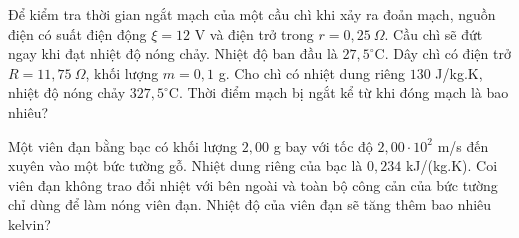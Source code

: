 \begin{ex}
Để kiểm tra thời gian ngắt mạch của một cầu chì khi xảy ra đoản mạch, nguồn điện có suất điện động $\xi=12$ V và điện trở trong $r=0,25\ \Omega$. Cầu chì sẽ đứt ngay khi đạt nhiệt độ nóng chảy. Nhiệt độ ban đầu là $27,5^\circ\mathrm{C}$. Dây chì có điện trở $R=11,75\ \Omega$, khối lượng $m=0,1$ g. Cho chì có nhiệt dung riêng $130$ J/kg.K, nhiệt độ nóng chảy $327,5^\circ\mathrm{C}$. Thời điểm mạch bị ngắt kể từ khi đóng mạch là bao nhiêu?
\loigiai{\[I=\frac{\xi}{R+r}=\frac{12}{11,75+0,25}=1\ \mathrm{A}.\]
\[P=I^2R=11,75\ \mathrm{W}.\]
\[m=0,1\ \mathrm{g}=10^{-4}\ \mathrm{kg},\qquad \Delta T=327,5-27,5=300\ \mathrm{K}.\]
\[Q=mc\Delta T=10^{-4}\cdot130\cdot300=3,9\ \mathrm{J}.\]
\[t=\frac{Q}{P}=\frac{3,9}{11,75}\approx0,33\ \mathrm{s}.\]}
\end{ex}

\begin{ex}
Một viên đạn bằng bạc có khối lượng $2,00$ g bay với tốc độ $2,00\cdot10^2$ m/s đến xuyên vào một bức tường gỗ. Nhiệt dung riêng của bạc là $0,234$ kJ/(kg.K). Coi viên đạn không trao đổi nhiệt với bên ngoài và toàn bộ công cản của bức tường chỉ dùng để làm nóng viên đạn. Nhiệt độ của viên đạn sẽ tăng thêm bao nhiêu kelvin?
\loigiai{\[m=0,002\ \mathrm{kg},\qquad c=234\ \mathrm{J/(kg.K)}.\]
\[Q=\frac12mv^2=\frac12\cdot0,002\cdot(200)^2=40\ \mathrm{J}.\]
\[\Delta T=\frac{Q}{mc}=\frac{40}{0,002\cdot234}\approx85,5\ \mathrm{K}.\]}
\end{ex}
